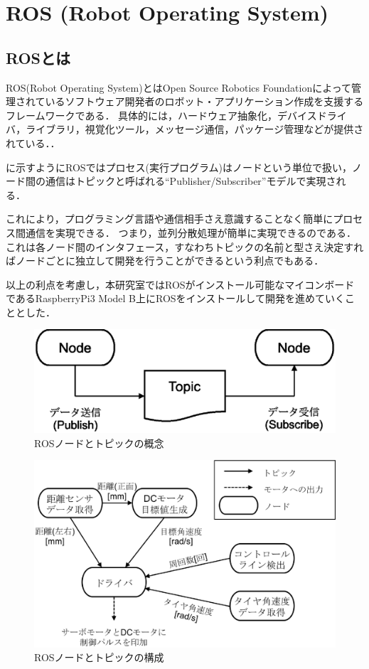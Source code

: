 \section{ROS (Robot Operating System)}
\subsection{ROSとは}
ROS(Robot Operating System)とはOpen Source Robotics Foundationによって管理されているソフトウェア開発者のロボット・アプリケーション作成を支援するフレームワークである．
具体的には，ハードウェア抽象化，デバイスドライバ，ライブラリ，視覚化ツール，メッセージ通信，パッケージ管理などが提供されている．\cite{kurazume}．

に示すようにROSではプロセス(実行プログラム)はノードという単位で扱い，ノード間の通信はトピックと呼ばれる``Publisher/Subscriber''モデルで実現される\cite{ogura}．

これにより，プログラミング言語や通信相手さえ意識することなく簡単にプロセス間通信を実現できる．
つまり，並列分散処理が簡単に実現できるのである．
これは各ノード間のインタフェース，すなわちトピックの名前と型さえ決定すればノードごとに独立して開発を行うことができるという利点でもある．

以上の利点を考慮し，本研究室ではROSがインストール可能なマイコンボードであるRaspberryPi3 Model B上にROSをインストールして開発を進めていくこととした．
\vspace{5mm}

\begin{figure}[htb]
  \centering
    \includegraphics[width=0.5\hsize]{picture/eps/ros_topic.eps}
    \caption{ROSノードとトピックの概念}
    \label{fig::ros_topic}
\end{figure}



\begin{figure}[htb]
  \centering
    \includegraphics[width=0.8\hsize]{picture/eps/ros_nodes.eps}
    \caption{ROSノードとトピックの構成}
    \label{fig::ros_nodes}
\end{figure}

